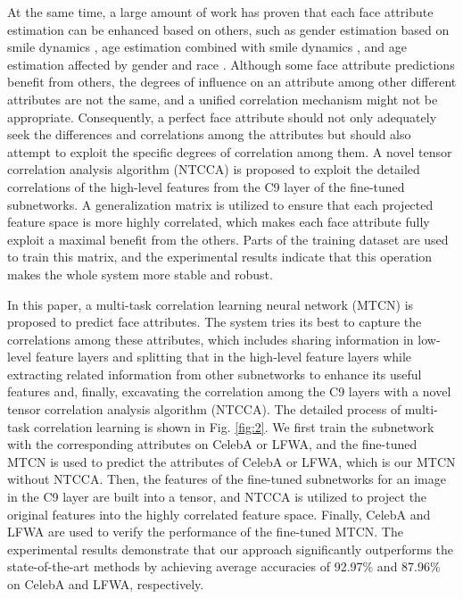 \documentclass{sig-alternate-05-2015}
\begin{document}
At the same time, a large amount of work has proven that each face attribute estimation can be enhanced based on others, such as gender estimation based on smile dynamics \cite{7755833}, age estimation combined with smile dynamics \cite{7060650}, and age estimation affected by gender and race \cite{5543609}. Although some face attribute predictions benefit from others, the degrees of influence on an attribute among other different attributes are not the same, and a unified correlation mechanism might not be appropriate. Consequently, a perfect face attribute should not only adequately seek the differences and correlations among the attributes but should also attempt to exploit the specific degrees of correlation among them. A novel tensor correlation analysis algorithm (NTCCA) is proposed to exploit the detailed correlations of the high-level features from the C9 layer of the fine-tuned subnetworks. A generalization matrix is utilized to ensure that each projected feature space is more highly correlated, which makes each face attribute fully exploit a maximal benefit from the others. Parts of the training dataset are used to train this matrix, and the experimental results indicate that this operation makes the whole system more stable and robust.

In this paper, a multi-task correlation learning neural network (MTCN) is proposed to predict face attributes. The system tries its best to capture the correlations among these attributes, which includes sharing information in low-level feature layers and splitting that in the high-level feature layers while extracting related information from other subnetworks to enhance its useful features and, finally, excavating the correlation among the C9 layers with a novel tensor correlation analysis algorithm (NTCCA). The detailed process of multi-task correlation learning is shown in Fig. \ref{fig:2}. We first train the subnetwork with the corresponding attributes on CelebA or LFWA, and the fine-tuned MTCN is used to predict the attributes of CelebA or LFWA, which is our MTCN without NTCCA. Then, the features of the fine-tuned subnetworks for an image in the C9 layer are built into a tensor, and NTCCA is utilized to project the original features into the highly correlated feature space. Finally, CelebA and LFWA are used to verify the performance of the fine-tuned MTCN. The experimental results demonstrate that our approach significantly outperforms the state-of-the-art methods by achieving average accuracies of 92.97\% and 87.96\% on CelebA and LFWA, respectively.
\end{document}
